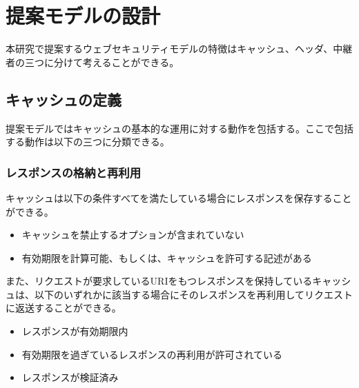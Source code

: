 \documentclass{css}
\begin{document}
\section{提案モデルの設計}
\label{sec:proposed}
本研究で提案するウェブセキュリティモデルの特徴はキャッシュ、ヘッダ、中継者の三つに分けて考えることができる。

\subsection{キャッシュの定義}
\label{cache}
提案モデルではキャッシュの基本的な運用に対する動作を包括する。ここで包括する動作は以下の三つに分類できる。

\subsubsection{レスポンスの格納と再利用}
\label{sec:store_reuse}
キャッシュは以下の条件すべてを満たしている場合にレスポンスを保存することができる。
\begin{itemize}
\item キャッシュを禁止するオプションが含まれていない
\item 有効期限を計算可能、もしくは、キャッシュを許可する記述がある
\end{itemize}

また、リクエストが要求しているURIをもつレスポンスを保持しているキャッシュは、以下のいずれかに該当する場合にそのレスポンスを再利用してリクエストに返送することができる。

\begin{itemize}
\item レスポンスが有効期限内
\item 有効期限を過ぎているレスポンスの再利用が許可されている
\item レスポンスが検証済み
\end{itemize}
\end{document}
